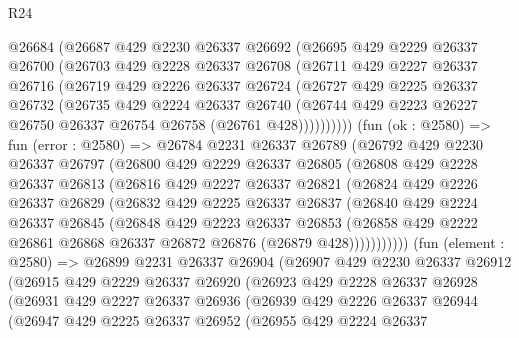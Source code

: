 \begin{lexlean}{R24}
\begin{coremodule}
      @26684
      (@26687
        @429
        @2230
        @26337
        @26692
        (@26695
          @429
          @2229
          @26337
          @26700
          (@26703
            @429
            @2228
            @26337
            @26708
            (@26711
              @429
              @2227
              @26337
              @26716
              (@26719
                @429
                @2226
                @26337
                @26724
                (@26727
                  @429
                  @2225
                  @26337
                  @26732
                  (@26735
                    @429
                    @2224
                    @26337
                    @26740
                    (@26744 @429 @2223 @26227 @26750 @26337 @26754 @26758 (@26761 @428))))))))))
    (fun (ok : @2580) =>
    fun (error : @2580) =>
    @26784
      @2231
      @26337
      @26789
      (@26792
        @429
        @2230
        @26337
        @26797
        (@26800
          @429
          @2229
          @26337
          @26805
          (@26808
            @429
            @2228
            @26337
            @26813
            (@26816
              @429
              @2227
              @26337
              @26821
              (@26824
                @429
                @2226
                @26337
                @26829
                (@26832
                  @429
                  @2225
                  @26337
                  @26837
                  (@26840
                    @429
                    @2224
                    @26337
                    @26845
                    (@26848
                      @429
                      @2223
                      @26337
                      @26853
                      (@26858 @429 @2222 @26861 @26868 @26337 @26872 @26876 (@26879 @428)))))))))))
    (fun (element : @2580) =>
    @26899
      @2231
      @26337
      @26904
      (@26907
        @429
        @2230
        @26337
        @26912
        (@26915
          @429
          @2229
          @26337
          @26920
          (@26923
            @429
            @2228
            @26337
            @26928
            (@26931
              @429
              @2227
              @26337
              @26936
              (@26939
                @429
                @2226
                @26337
                @26944
                (@26947
                  @429
                  @2225
                  @26337
                  @26952
                  (@26955
                    @429
                    @2224
                    @26337

\end{coremodule}
\end{lexlean}
